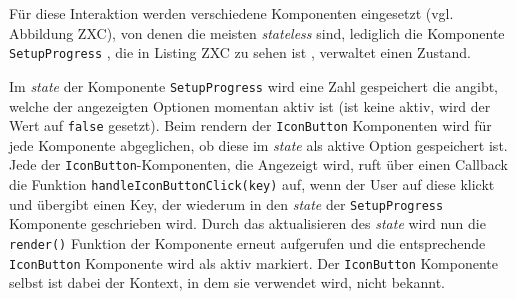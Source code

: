 Für diese Interaktion werden verschiedene Komponenten eingesetzt (vgl. Abbildung ZXC), von denen die meisten \textit{stateless} sind, lediglich die Komponente \verb|SetupProgress| , die in Listing ZXC zu sehen ist \footnotemark{}, verwaltet einen Zustand.


Im \textit{state} der Komponente  \verb|SetupProgress| wird eine Zahl gespeichert die angibt, welche der angezeigten Optionen momentan aktiv ist (ist keine aktiv, wird der Wert auf \verb|false| gesetzt). Beim rendern der \verb|IconButton| Komponenten wird für jede Komponente abgeglichen, ob diese im \textit{state} als aktive Option gespeichert ist. Jede der \verb|IconButton|-Komponenten, die Angezeigt wird, ruft über einen Callback die Funktion \verb|handleIconButtonClick(key)| auf, wenn der User auf diese klickt und übergibt einen Key, der wiederum in den \textit{state} der  \verb|SetupProgress| Komponente geschrieben wird. Durch das aktualisieren des \textit{state} wird nun die \verb|render()| Funktion der Komponente erneut aufgerufen und die entsprechende \verb|IconButton| Komponente wird als aktiv markiert.
Der  \verb|IconButton| Komponente selbst ist dabei der Kontext, in dem sie verwendet wird, nicht bekannt.


